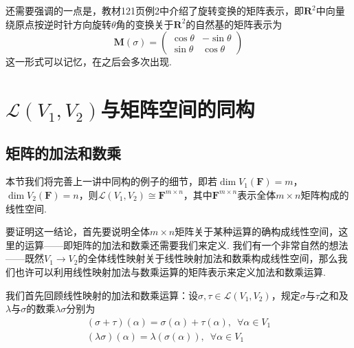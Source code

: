 还需要强调的一点是，教材121页例2中介绍了旋转变换的矩阵表示，即$\mathbf{R}^2$中向量绕原点按逆时针方向旋转$\theta$角的变换关于$\mathbf{R}^2$的自然基的矩阵表示为
\[\mathbf{M}(\sigma)=\begin{pmatrix}
        \cos\theta & -\sin\theta \\
        \sin\theta & \cos\theta
    \end{pmatrix}\]
这一形式可以记忆，在之后会多次出现.

\section{$\mathcal{L}(V_1,V_2)$与矩阵空间的同构}

\subsection{矩阵的加法和数乘}

本节我们将完善上一讲中同构的例子的细节，即若$\dim V_1(\mathbf{F})=m$，$\dim V_2(\mathbf{F})=n$，则$\mathcal{L}(V_1,V_2) \cong \mathbf{F}^{m \times n}$，其中$\mathbf{F}^{m \times n}$表示全体$m\times n$矩阵构成的线性空间.

要证明这一结论，首先要说明全体$m\times n$矩阵关于某种运算的确构成线性空间，这里的运算——即矩阵的加法和数乘还需要我们来定义. 我们有一个非常自然的想法——既然$V_1\to V_2$的全体线性映射关于线性映射加法和数乘构成线性空间，那么我们也许可以利用线性映射加法与数乘运算的矩阵表示来定义加法和数乘运算.

我们首先回顾线性映射的加法和数乘运算：设$\sigma,\tau\in \mathcal{L}(V_1,V_2)$，规定$\sigma$与$\tau$之和及$\lambda$与$\sigma$的数乘$\lambda\sigma$分别为
\begin{gather*}
    (\sigma+\tau)(\alpha)=\sigma(\alpha)+\tau(\alpha),\enspace\forall\alpha\in V_1 \\
    (\lambda\sigma)(\alpha)=\lambda(\sigma(\alpha)),\enspace\forall\alpha\in V_1
\end{gather*}

